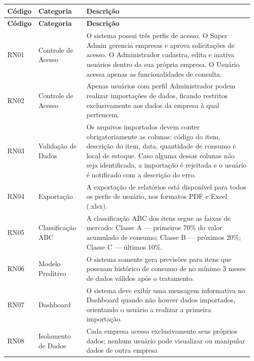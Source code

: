 \documentclass[12pt,a4paper]{article}
\begin{document}
\begin{center}
\begin{longtable}{p{} p{} p{}}
\toprule
\textbf{Código} & \textbf{Categoria} & \textbf{Descrição} \\
\midrule
\endfirsthead
\toprule
\textbf{Código} & \textbf{Categoria} & \textbf{Descrição} \\
\midrule
\endhead

RN01 & Controle de Acesso & O sistema possui três perfis de acesso. O Super Admin gerencia empresas e aprova solicitações de acesso. O Administrador cadastra, edita e inativa usuários dentro da sua própria 
empresa. O Usuário acessa apenas as funcionalidades de consulta. \\\midrule

RN02 & Controle de Acesso & Apenas usuários com perfil Administrador podem realizar importações de dados, ficando restritos exclusivamente aos dados da empresa à qual pertencem. \\\midrule

RN03 & Validação de Dados & Os arquivos importados devem conter obrigatoriamente as colunas: código do item, descrição do item, data, quantidade de consumo e local de estoque. Caso alguma dessas colunas não seja identificada, a importação é rejeitada e o usuário é notificado com a descrição do erro. \\\midrule

RN04 & Exportação & A exportação de relatórios está disponível para todos os perfis de usuário, nos formatos PDF e Excel (.xlsx). \\\midrule

RN05 & Classificação ABC & A classificação ABC dos itens segue as faixas de mercado: Classe A — primeiros 70\% do valor acumulado de consumo; Classe B — próximos 20\%; Classe C — últimos 10\%. \\\midrule

RN06 & Modelo Preditivo & O sistema somente gera previsões para itens que possuam histórico de consumo de no mínimo 3 meses de dados válidos após o tratamento. \\\midrule

RN07 & Dashboard & O sistema deve exibir uma mensagem informativa no Dashboard quando não houver dados importados, orientando o usuário a realizar a primeira importação. \\\midrule

RN08 & Isolamento de Dados & Cada empresa acessa exclusivamente seus próprios dados; nenhum usuário pode visualizar ou manipular dados de outra empresa \\\midrule


\end{longtable}
\end{center}
\end{document}
